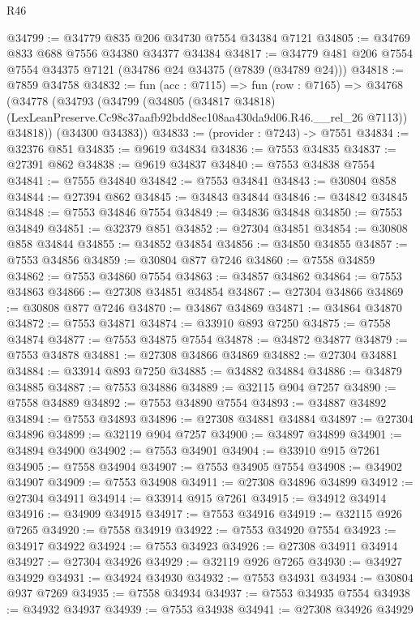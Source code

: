 \begin{lexlean}{R46}
\begin{coremodule}
@34799 := @34779 @835 @206 @34730 @7554 @34384 @7121
@34805 := @34769 @833 @688 @7556 @34380 @34377 @34384
@34817 := @34779 @481 @206 @7554 @7554 @34375 @7121 (@34786 @24 @34375 (@7839 (@34789 @24)))
@34818 := @7859 @34758
@34832 := fun (acc : @7115) =>
  fun (row : @7165) =>
  @34768
    (@34778
      (@34793
        (@34799
          (@34805
            (@34817 @34818)
            (LexLeanPreserve.Cc98c37aafb92bdd8ec108aa430da9d06.R46.__rel_26 @7113))
          @34818))
      (@34300 @34383))
@34833 := (provider : @7243) -> @7551
@34834 := @32376 @851
@34835 := @9619 @34834
@34836 := @7553 @34835
@34837 := @27391 @862
@34838 := @9619 @34837
@34840 := @7553 @34838 @7554
@34841 := @7555 @34840
@34842 := @7553 @34841
@34843 := @30804 @858
@34844 := @27394 @862
@34845 := @34843 @34844
@34846 := @34842 @34845
@34848 := @7553 @34846 @7554
@34849 := @34836 @34848
@34850 := @7553 @34849
@34851 := @32379 @851
@34852 := @27304 @34851
@34854 := @30808 @858 @34844
@34855 := @34852 @34854
@34856 := @34850 @34855
@34857 := @7553 @34856
@34859 := @30804 @877 @7246
@34860 := @7558 @34859
@34862 := @7553 @34860 @7554
@34863 := @34857 @34862
@34864 := @7553 @34863
@34866 := @27308 @34851 @34854
@34867 := @27304 @34866
@34869 := @30808 @877 @7246
@34870 := @34867 @34869
@34871 := @34864 @34870
@34872 := @7553 @34871
@34874 := @33910 @893 @7250
@34875 := @7558 @34874
@34877 := @7553 @34875 @7554
@34878 := @34872 @34877
@34879 := @7553 @34878
@34881 := @27308 @34866 @34869
@34882 := @27304 @34881
@34884 := @33914 @893 @7250
@34885 := @34882 @34884
@34886 := @34879 @34885
@34887 := @7553 @34886
@34889 := @32115 @904 @7257
@34890 := @7558 @34889
@34892 := @7553 @34890 @7554
@34893 := @34887 @34892
@34894 := @7553 @34893
@34896 := @27308 @34881 @34884
@34897 := @27304 @34896
@34899 := @32119 @904 @7257
@34900 := @34897 @34899
@34901 := @34894 @34900
@34902 := @7553 @34901
@34904 := @33910 @915 @7261
@34905 := @7558 @34904
@34907 := @7553 @34905 @7554
@34908 := @34902 @34907
@34909 := @7553 @34908
@34911 := @27308 @34896 @34899
@34912 := @27304 @34911
@34914 := @33914 @915 @7261
@34915 := @34912 @34914
@34916 := @34909 @34915
@34917 := @7553 @34916
@34919 := @32115 @926 @7265
@34920 := @7558 @34919
@34922 := @7553 @34920 @7554
@34923 := @34917 @34922
@34924 := @7553 @34923
@34926 := @27308 @34911 @34914
@34927 := @27304 @34926
@34929 := @32119 @926 @7265
@34930 := @34927 @34929
@34931 := @34924 @34930
@34932 := @7553 @34931
@34934 := @30804 @937 @7269
@34935 := @7558 @34934
@34937 := @7553 @34935 @7554
@34938 := @34932 @34937
@34939 := @7553 @34938
@34941 := @27308 @34926 @34929

\end{coremodule}
\end{lexlean}
